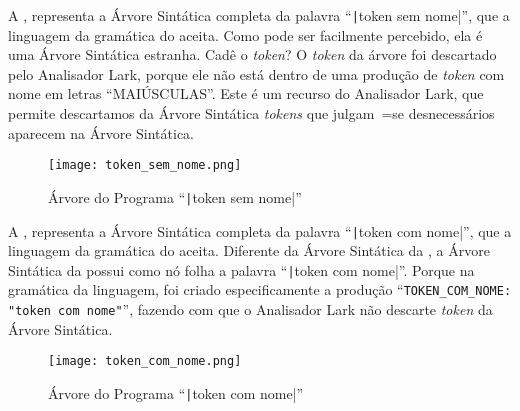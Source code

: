 A ,
representa a Árvore Sintática completa da palavra ``\texttt|token sem nome|'',
que a linguagem da gramática do  aceita.
Como pode ser facilmente percebido,
ela é uma Árvore Sintática estranha.
Cadê o \textit{token}?
O \textit{token} da árvore foi descartado pelo Analisador Lark,
porque ele não está dentro de uma produção de \textit{token} com nome em letras ``MAIÚSCULAS''.
Este é um recurso do Analisador Lark,
que permite descartamos da Árvore Sintática \textit{tokens} que julgam~=se desnecessários aparecem na Árvore Sintática.
\begin{figure}[H]
\caption[Árvore do Programa ``token sem nome'']{Árvore do Programa ``\texttt|token sem nome|''}
\label{figure:ArvoresDosTokens1}
\centering
\texttt{[image: token\_sem\_nome.png]}
\end{figure}

A ,
representa a Árvore Sintática completa da palavra ``\texttt|token com nome|'',
que a linguagem da gramática do  aceita.
Diferente da Árvore Sintática da ,
a Árvore Sintática da  possui como nó folha a palavra ``\texttt|token com nome|''.
Porque na gramática da linguagem,
foi criado especificamente a produção ``\texttt{TOKEN_COM_NOME:
"token com nome"}'',
fazendo com que o Analisador Lark não descarte \textit{token} da Árvore Sintática.
\begin{figure}[H]
\caption[Árvore do Programa ``token com nome'']{Árvore do Programa ``\texttt|token com nome|''}
\label{figure:ArvoresDosTokens2}
\centering
\texttt{[image: token\_com\_nome.png]}
\end{figure}

